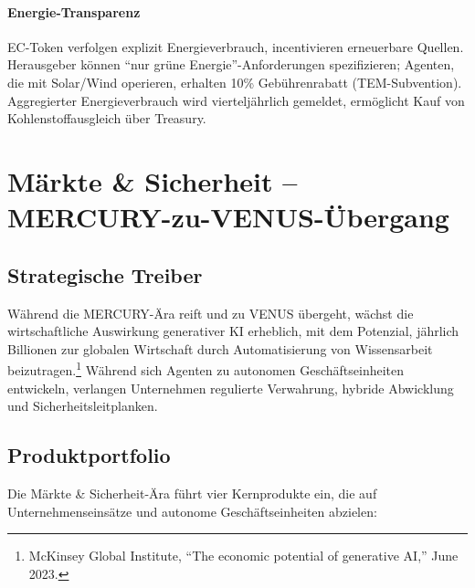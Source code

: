 \documentclass[11pt]{article}
\begin{document}
\paragraph{Energie-Transparenz} EC-Token verfolgen explizit Energieverbrauch, incentivieren erneuerbare Quellen. Herausgeber können ``nur grüne Energie''-Anforderungen spezifizieren; Agenten, die mit Solar/Wind operieren, erhalten 10\% Gebührenrabatt (TEM-Subvention). Aggregierter Energieverbrauch wird vierteljährlich gemeldet, ermöglicht Kauf von Kohlenstoffausgleich über Treasury.

\section{Märkte \& Sicherheit -- MERCURY-zu-VENUS-Übergang}
\subsection{Strategische Treiber}
Während die MERCURY-Ära reift und zu VENUS übergeht, wächst die wirtschaftliche Auswirkung generativer KI erheblich, mit dem Potenzial, jährlich Billionen zur globalen Wirtschaft durch Automatisierung von Wissensarbeit beizutragen.\footnote{McKinsey Global Institute, ``The economic potential of generative AI,'' June 2023.} Während sich Agenten zu autonomen Geschäftseinheiten entwickeln, verlangen Unternehmen regulierte Verwahrung, hybride Abwicklung und Sicherheitsleitplanken.

\subsection{Produktportfolio}
Die Märkte \& Sicherheit-Ära führt vier Kernprodukte ein, die auf Unternehmenseinsätze und autonome Geschäftseinheiten abzielen:
\end{document}

